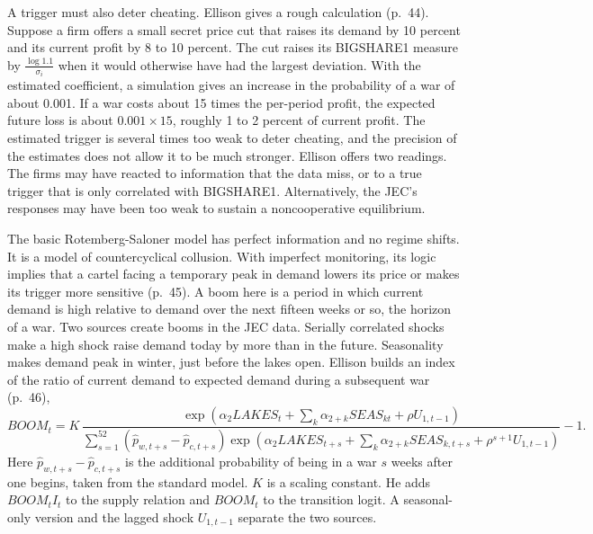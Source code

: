 A trigger must also deter cheating. Ellison gives a rough calculation (p.~44). Suppose a firm offers a small secret
price cut that raises its demand by 10 percent and its current profit by 8 to 10 percent. The cut raises its
BIGSHARE1 measure by $\frac{\log 1.1}{\sigma_i}$ when it would otherwise have had the largest deviation. With the
estimated coefficient, a simulation gives an increase in the probability of a war of about 0.001. If a war costs
about 15 times the per-period profit, the expected future loss is about $0.001 \times 15$, roughly 1 to 2 percent of
current profit. The estimated trigger is several times too weak to deter cheating, and the precision of the estimates
does not allow it to be much stronger. Ellison offers two readings. The firms may have reacted to information that
the data miss, or to a true trigger that is only correlated with BIGSHARE1. Alternatively, the JEC's responses may
have been too weak to sustain a noncooperative equilibrium.

The basic Rotemberg-Saloner model has perfect information and no regime shifts. It is a model of countercyclical
collusion. With imperfect monitoring, its logic implies that a cartel facing a temporary peak in demand lowers its
price or makes its trigger more sensitive (p.~45). A boom here is a period in which current demand is high
relative to demand over the next fifteen weeks or so, the horizon of a war. Two sources create booms in the JEC data.
Serially correlated shocks make a high shock raise demand today by more than in the future. Seasonality makes demand
peak in winter, just before the lakes open. Ellison builds an index of the ratio of current demand to expected
demand during a subsequent war (p.~46),
\begin{equation}\label{eq:13-ellison-boom}
  BOOM_t = K\,\frac{\exp\left(\alpha_2 LAKES_t + \sum_k \alpha_{2+k} SEAS_{kt} + \rho U_{1,t-1}\right)}
  {\sum_{s=1}^{52}\left(\hat p_{w,t+s} - \hat p_{c,t+s}\right)
   \exp\left(\alpha_2 LAKES_{t+s} + \sum_k \alpha_{2+k} SEAS_{k,t+s} + \rho^{s+1}U_{1,t-1}\right)} - 1 .
\end{equation}
Here $\hat p_{w,t+s} - \hat p_{c,t+s}$ is the additional probability of being in a war $s$ weeks after one begins,
taken from the standard model. $K$ is a scaling constant. He adds $BOOM_t I_t$ to the supply relation and
$BOOM_t$ to the transition logit. A seasonal-only version and the lagged shock $U_{1,t-1}$ separate the two sources.

